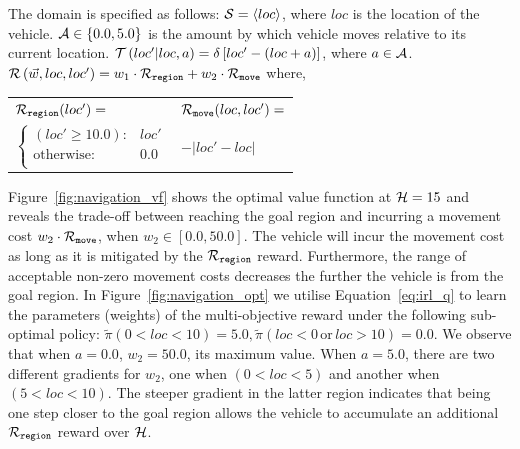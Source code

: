 \documentclass[letterpaper]{article}
\begin{document}
The domain is specified as follows: {\footnotesize $ \mathcal{S} = \left\langle loc \right\rangle$}, where $ loc $ is the location of the vehicle. {\footnotesize $ \mathcal{A} \in \left\lbrace 0.0, 5.0 \right\rbrace $} is the amount by which vehicle moves relative to its current location. {\footnotesize $ \mathcal{T}\left( loc' | loc, a \right) = \delta \left[ loc' - (loc + a) \right] $}, where {\footnotesize $ a \in \mathcal{A} $}. {\footnotesize $ \mathcal{R}\left(\vec{w}, loc, loc'\right) = w_1 \cdot \mathcal{R}_{\mathtt{region}} + w_2 \cdot \mathcal{R}_{\mathtt{move}} $} where,

{\footnotesize 
    \begin{tabular}{ll}    
        $ \mathcal{R}_{\mathtt{region}}(loc') = $ &  $ \mathcal{R}_{\mathtt{move}}(loc, loc') =  $ \\
        \qquad $ \begin{cases}
        (loc' \geq 10.0 ) : 				& loc' \\
        \text{otherwise} : 					& 0.0 \\
        \end{cases} $ 						& \qquad $ - \lvert loc' - loc \rvert  $\\
    \end{tabular}
} 

Figure~\ref{fig:navigation_vf} shows the optimal value function at {\footnotesize$ \mathcal{H} = 15 $} and reveals the trade-off between reaching the goal region and incurring a movement cost {\footnotesize $w_2 \cdot \mathcal{R}_{\mathtt{move}}$}, when {\footnotesize $w_2 \in [0.0, 50.0]$}. The vehicle will incur the movement cost as long as it is mitigated by the {\footnotesize $ \mathcal{R}_{\mathtt{region}}$} reward. Furthermore, the range of acceptable non-zero movement costs decreases the further the vehicle is from the goal region. 
In Figure~\ref{fig:navigation_opt} we utilise Equation~\eqref{eq:irl_q} to learn the parameters (weights) of the multi-objective reward under the following sub-optimal policy: {\footnotesize $ \tilde{\pi}(0 < loc < 10) = 5.0,  \tilde{\pi}(loc < 0 \,\mathrm{or}\, loc > 10) = 0.0$}. We observe that when {\footnotesize $a = 0.0$}, {\footnotesize $ w_2 = 50.0$}, its maximum value. When {\footnotesize $a = 5.0$}, there are two different gradients for {\footnotesize $ w_2 $}, one when {\footnotesize $ (0 < loc < 5) $} and another when {\footnotesize $ (5 < loc < 10) $}. 
The steeper gradient in the latter region indicates that being one step closer to the goal region allows the vehicle to accumulate an additional {\footnotesize $ \mathcal{R}_{\mathtt{region}}$} reward over {\footnotesize$ \mathcal{H} $}.
\end{document}
